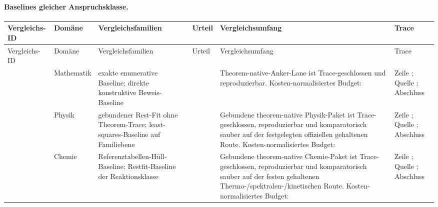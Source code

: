 \paragraph{Baselines gleicher Anspruchsklasse.}
\begingroup
\scriptsize
\setlength{\emergencystretch}{1.5em}
\setlength{\tabcolsep}{2pt}
\setlength{\LTleft}{0pt}
\setlength{\LTright}{0pt}
\begin{longtable}{@{}L{0.14\textwidth}L{0.09\textwidth}L{0.17\textwidth}L{0.10\textwidth}L{0.23\textwidth}L{0.18\textwidth}@{}}
\toprule
Vergleichs-ID & Domäne & Vergleichsfamilien & Urteil & Vergleichsumfang & Trace \\
\midrule
\endfirsthead
\toprule
Vergleichs-ID & Domäne & Vergleichsfamilien & Urteil & Vergleichsumfang & Trace \\
\midrule
\endhead
{} & Mathematik & exakte enumerative Baseline; direkte konstruktive Beweis-Baseline &  & Theorem-native-Anker-Lane ist Trace-geschlossen und reproduzierbar. \allowbreak Kosten-normalisiertes Budget:  & Zeile ; \allowbreak Quelle ; \allowbreak Abschluss  \\
 & Physik & gebundener Rest-Fit ohne Theorem-Trace; least-squares-Baseline auf Familiebene &  & Gebundene theorem-native Physik-Paket ist Trace-geschlossen, reproduzierbar und komparatorisch sauber auf der festgelegten offiziellen gehaltenen Route. \allowbreak Kosten-normalisiertes Budget:  & Zeile ; \allowbreak Quelle ; \allowbreak Abschluss  \\
 & Chemie & Referenztabellen-Hüll-Baseline; Restfit-Baseline der Reaktionsklasse &  & Gebundene theorem-native Chemie-Paket ist Trace-geschlossen, reproduzierbar und komparatorisch sauber auf der festen gehaltenen Thermo-/spektralen-/kinetischen Route. \allowbreak Kosten-normalisiertes Budget:  & Zeile ; \allowbreak Quelle ; \allowbreak Abschluss  \\

\end{longtable}
